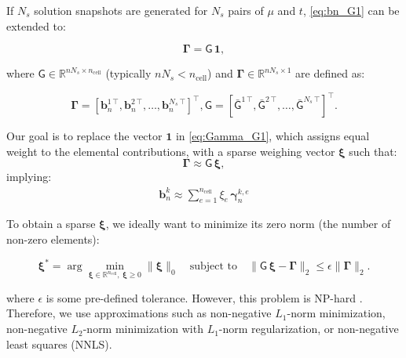 \documentclass[11pt]{article}
\renewcommand{\vec}[1]{\mathbf{#1}}
\newcommand{\mat}[1]{\mathsf{#1}}
\begin{document}
If $N_s$ solution snapshots are generated for $N_s$ pairs of $\mu$ and $t$, \cref{eq:bn_G1} can be extended to:

\begin{equation}
\boldsymbol{\Gamma} = \mat{G}\, \vec{1},
\label{eq:Gamma_G1}
\end{equation}

where $\mat{G} \in \mathbb{R}^{n N_s \times n_{\text{cell}}}$ (typically $n N_s < n_{\text{cell}}$) and $\boldsymbol{\Gamma} \in \mathbb{R}^{n N_s \times 1}$ are defined as:

\begin{subequations}
\begin{equation}
\boldsymbol{\Gamma} = \left[ \vec{b}_n^{1\,\top}, \vec{b}_n^{2\,\top}, \hdots, \vec{b}_n^{N_s\,\top}\right]^\top,
\end{equation}
\begin{equation}
\mat{G} = \left[ \bar{\mat{G}}^{1\,\top}, \bar{\mat{G}}^{2\,\top}, \hdots, \bar{\mat{G}}^{N_s\,\top}\right]^\top.
\end{equation}
\end{subequations}


Our goal is to replace the vector $\vec{1}$ in \cref{eq:Gamma_G1}, which assigns equal weight to the elemental contributions, with a sparse weighing vector $\boldsymbol{\xi}$ such that:
\begin{equation}
\boldsymbol{\Gamma} \approx \mat{G}\, \boldsymbol{\xi},
\label{eq:Gamma_Gxi}
\end{equation}
implying:
\begin{align}
\vec{b}^k_n \approx \sum_{e=1}^{n_{\text{cell}}} \xi_e\, \boldsymbol{\gamma}^{k,e}_{n}
\label{eq:bn_approx}
\end{align}

To obtain a sparse $\boldsymbol{\xi}$, we ideally want to minimize its zero norm (the number of non-zero elements):

\begin{equation}
\boldsymbol{\xi}^\ast = \arg \min_{\boldsymbol{\xi} \in \mathbb{R}^{n_{\text{cell}}},\ \boldsymbol{\xi} \geq 0} \| \boldsymbol{\xi} \|_0 \quad \text{subject to} \quad \| \mat{G}\, \boldsymbol{\xi} - \boldsymbol{\Gamma} \|_2 \leq \epsilon \| \boldsymbol{\Gamma} \|_2.
\label{eq:L0_min}
\end{equation}

where $\epsilon$ is some pre-defined tolerance.
However, this problem is NP-hard \cite{farhat2014dimensional}.
Therefore, we use approximations such as non-negative $L_1$-norm minimization, non-negative $L_2$-norm minimization with $L_1$-norm regularization, or non-negative least squares (NNLS).
\end{document}
